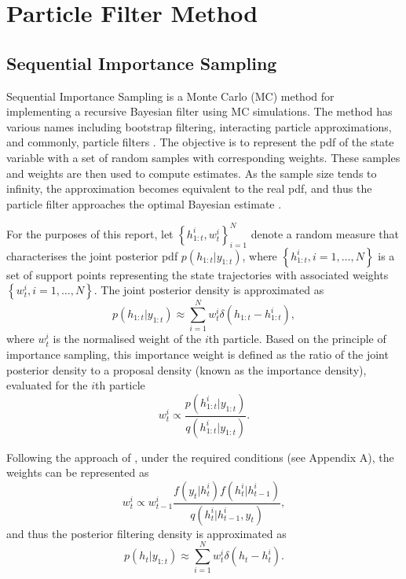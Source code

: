 \documentclass[10pt, a4paper]{article}
\numberwithin{equation}{section}
\begin{document}
\section{Particle Filter Method}
\subsection{Sequential Importance Sampling}
Sequential Importance Sampling is a Monte Carlo (MC) method for implementing a recursive Bayesian filter using MC simulations. The method has various names including bootstrap filtering, interacting particle approximations, and commonly, particle filters \parencite{Gordon1993NovelAT, Arulampalam2002}. The objective is to represent the pdf of the state variable with a set of random samples with corresponding weights. These samples and weights are then used to compute estimates. As the sample size tends to infinity, the approximation becomes equivalent to the real pdf, and thus the particle filter approaches the optimal Bayesian estimate \parencite{Arulampalam2002}.

For the purposes of this report, let \({\left\{h_{1:t}^{i}, w_t^{i}\right\}}_{i=1}^{N}\) denote a random measure that characterises the joint posterior pdf \(p(h_{1:t} | y_{1:t})\), where \({\left\{h_{1:t}^{i}, i = 1, \dots, N\right\}}\) is a set of support points representing the state trajectories with associated weights \({\left\{w_t^{i}, i = 1, \dots, N\right\}}\). The joint posterior density is approximated as
\begin{equation}
    p(h_{1:t} | y_{1:t}) \approx \sum_{i=1}^N w_t^{i} \delta(h_{1:t} - h_{1:t}^{i}),
\end{equation}
where \(w_t^{i}\) is the normalised weight of the \(i\)th particle. Based on the principle of importance sampling, this importance weight is defined as the ratio of the joint posterior density to a proposal density (known as the importance density), evaluated for the $i$th particle
\begin{equation}
    w_t^{i} \propto \frac{p(h_{1:t}^{i} |{} y_{1:t})}{q(h_{1:t}^{i} |{} y_{1:t})}.
\end{equation}

Following the approach of \textcite{Arulampalam2002}, under the required conditions (see Appendix A), the weights can be represented as
\begin{equation}
    w_t^{i} \propto w_{t-1}^{i} \frac{f(y_t | h_t^{i}) f(h_t^{i} | h_{t-1}^{i})}{q(h_t^{i} | h_{t-1}^{i}, y_t)}, \label{eq: SIS weight}
\end{equation}
and thus the posterior filtering density is approximated as
\begin{equation}
    p(h_t |{} y_{1:t}) \approx \sum_{i=1}^N w_t^{i} \delta(h_t - h_t^{i}). \label{eq: Posterior PDF Method}
\end{equation}
\end{document}
